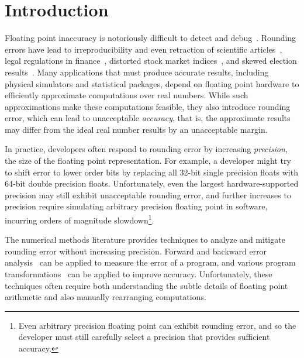 \documentclass[paper.tex]{subfiles}
\begin{document}
\section{Introduction}
\label{sec:introduction}

Floating point inaccuracy is notoriously difficult to detect and
debug~\cite{berkeley00-needle-like, kahan-java-hurts}.  Rounding
errors have lead to irreproducibility and even retraction of
scientific articles~\cite{num-issues-in-stat, num-replication,
  stat-robustness}, legal regulations in finance~\cite{euro-rounding},
distorted stock market indices~\cite{distort-stock,
  wall-street-distort-stock}, and skewed election
results~\cite{round-elections}.  Many applications that must produce
accurate results, including physical simulators and statistical
packages, depend on floating point hardware to efficiently approximate
computations over real numbers.  While such approximations make these
computations feasible, they also introduce rounding error, which can
lead to unacceptable \textit{accuracy}, that is, the approximate
results may differ from the ideal real number results by an
unacceptable margin.


In practice, developers often respond to rounding error by increasing
\textit{precision}, the size of the floating point representation.
For example, a developer might try to shift error to lower order bits
by replacing all 32-bit single precision floats with 64-bit double
precision floats.  Unfortunately, even the largest hardware-supported
precision may still exhibit unacceptable rounding error, and further
increases to precision require simulating arbitrary precision floating
point in software, incurring orders of magnitude
slowdown\footnote{Even arbitrary precision floating point can exhibit
  rounding error, and so the developer must still carefully select a
  precision that provides sufficient accuracy.}.

The numerical methods literature provides techniques to analyze and
mitigate rounding error without increasing precision.  Forward and
backward error analysis~\cite{higham-book, kahan-error-survey} can be
applied to measure the error of a program, and various program
transformations~\cite{book87-nmse} can be applied to improve accuracy.
Unfortunately, these techniques often require both understanding the
subtle details of floating point arithmetic and also manually
rearranging computations.
\end{document}
